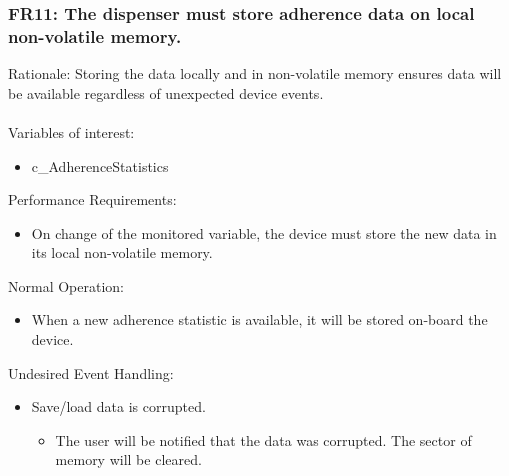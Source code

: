 \documentclass[12pt]{article}
\begin{document}
\subsubsection*{FR11:  The dispenser must store adherence data on local non-volatile memory.}
Rationale: Storing the data locally and in non-volatile memory ensures data will be available regardless of unexpected device events. 
\\\\
Variables of interest:
\begin{itemize}[noitemsep,topsep=0pt]
    \item c\_AdherenceStatistics
\end{itemize} 
\bigskip
Performance Requirements:
\begin{itemize}[noitemsep,topsep=0pt]
    \item On change of the monitored variable, the device must store the new data in its local non-volatile memory.
\end{itemize}
\bigskip
Normal Operation:
\begin{itemize}[noitemsep,topsep=0pt]
    \item When a new adherence statistic is available, it will be stored on-board the device.
\end{itemize}
\bigskip
Undesired Event Handling:
\begin{itemize}[noitemsep,topsep=0pt]
    \item Save/load data is corrupted.
    \begin{itemize}
        \item The user will be notified that the data was corrupted. The sector of memory will be cleared.
    \end{itemize}
\end{itemize}
\bigskip

\end{document}
